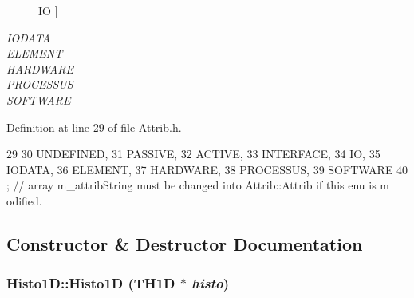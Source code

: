 \begin{Desc}
\begin{description}
{{IO}
\label{classAttrib_a69e171d7cc6417835a5a306d3c764235a1420a5b8c0540b2af210b6975eded7f9}
}]\item[{\em 
\hypertarget{classAttrib_a69e171d7cc6417835a5a306d3c764235a0af3b0d0ac323c1704e6c69cf90add28}{
IODATA}
\label{classAttrib_a69e171d7cc6417835a5a306d3c764235a0af3b0d0ac323c1704e6c69cf90add28}
}]\item[{\em 
\hypertarget{classAttrib_a69e171d7cc6417835a5a306d3c764235a7788bc5dd333fd8ce18562b269c9dab1}{
ELEMENT}
\label{classAttrib_a69e171d7cc6417835a5a306d3c764235a7788bc5dd333fd8ce18562b269c9dab1}
}]\item[{\em 
\hypertarget{classAttrib_a69e171d7cc6417835a5a306d3c764235a61ceb22149f365f1780d18f9d1459423}{
HARDWARE}
\label{classAttrib_a69e171d7cc6417835a5a306d3c764235a61ceb22149f365f1780d18f9d1459423}
}]\item[{\em 
\hypertarget{classAttrib_a69e171d7cc6417835a5a306d3c764235a75250e29692496e73effca2c0330977f}{
PROCESSUS}
\label{classAttrib_a69e171d7cc6417835a5a306d3c764235a75250e29692496e73effca2c0330977f}
}]\item[{\em 
\hypertarget{classAttrib_a69e171d7cc6417835a5a306d3c764235a103a67cd0b8f07ef478fa45d4356e27b}{
SOFTWARE}
\label{classAttrib_a69e171d7cc6417835a5a306d3c764235a103a67cd0b8f07ef478fa45d4356e27b}
}]\end{description}
\end{Desc}



Definition at line 29 of file Attrib.h.


\begin{DoxyCode}
29                 {
30     UNDEFINED,
31     PASSIVE,
32     ACTIVE,
33     INTERFACE,
34     IO,
35     IODATA,
36     ELEMENT,
37     HARDWARE,
38     PROCESSUS,
39     SOFTWARE 
40   }; // array m_attribString must be changed into Attrib::Attrib if this enu is m
      odified. 
\end{DoxyCode}


\subsection{Constructor \& Destructor Documentation}
\hypertarget{classHisto1D_aecd55af9b972863d5cee5a387746fb96}{
\subsubsection[{Histo1D}]{\setlength{\rightskip}{0pt plus 5cm}Histo1D::Histo1D (TH1D $\ast$ {\em histo})}}
\label{classHisto1D_aecd55af9b972863d5cee5a387746fb96}


